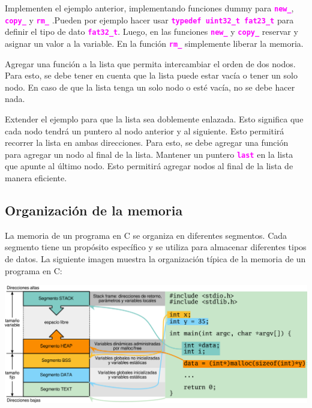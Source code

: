 \documentclass[]{scrartcl}
\newcommand{\hl}[1]{\textcolor{magenta}{\textbf{\texttt{#1}}}}
\begin{document}
\begin{exbox}
  Implementen el ejemplo anterior, implementando funciones dummy para \hl{new\_}, \hl{copy\_} y \hl{rm\_} .Pueden por ejemplo hacer usar \hl{typedef uint32\_t fat23\_t} para definir el tipo de dato \hl{fat32\_t}. Luego, en las funciones \hl{new\_} y \hl{copy\_} reservar y asignar un valor a la variable. En la función \hl{rm\_} simplemente liberar la memoria.
\end{exbox}

\begin{exbox}
  Agregar una función a la lista que permita intercambiar el orden de dos nodos. Para esto, se debe tener en cuenta que la lista puede estar vacía o tener un solo nodo. En caso de que la lista tenga un solo nodo o esté vacía, no se debe hacer nada.
\end{exbox}

\begin{exbox}
  Extender el ejemplo para que la lista sea doblemente enlazada. Esto significa que cada nodo tendrá un puntero al nodo anterior y al siguiente. Esto permitirá recorrer la lista en ambas direcciones. Para esto, se debe agregar una función para agregar un nodo al final de la lista. Mantener un puntero \hl{last} en la lista que apunte al último nodo. Esto permitirá agregar nodos al final de la lista de manera eficiente.
\end{exbox}

\subsection*{Organización de la memoria}

La memoria de un programa en C se organiza en diferentes segmentos. Cada segmento tiene un propósito específico y se utiliza para almacenar diferentes tipos de datos. La siguiente imagen muestra la organización típica de la memoria de un programa en C:

\begin{center}
  \includegraphics[scale=0.39]{./img/memory.png}  
  \label{fig:memoria}
\end{center}
\end{document}
